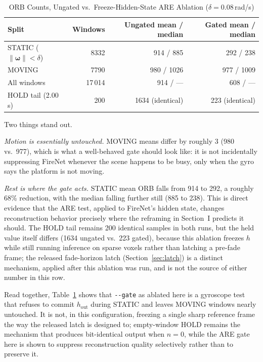 \documentclass[journal]{IEEEtran}
\DeclareRobustCommand{\norm}[1]{\lVert #1 \rVert}
\begin{document}
\begin{table}[!t]
\caption{ORB Counts, Ungated vs.\ Freeze-Hidden-State ARE Ablation
(\(\delta = 0.08\)\,rad/s)}
\label{tab:orb}
\centering
\begin{tabular}{@{}lrrr@{}}
\toprule
Split & Windows & Ungated mean / median & Gated mean / median \\
\midrule
STATIC (\(\norm{\boldsymbol{\omega}}<\delta\)) & 8332 & 914 / 885 & 292 / 238 \\
MOVING & 7790 & 980 / 1026 & 977 / 1009 \\
All windows & 17\,014 & 914 / --- & 608 / --- \\
HOLD tail (2.00\,s) & 200 & 1634 (identical) & 223 (identical) \\
\bottomrule
\end{tabular}
\end{table}

Two things stand out.

\textit{Motion is essentially untouched.} MOVING means differ by roughly 3 (980
vs.\ 977), which is what a well-behaved gate should look like: it is not
incidentally suppressing FireNet whenever the scene happens to be busy, only
when the gyro says the platform is not moving.

\textit{Rest is where the gate acts.} STATIC mean ORB falls from 914 to 292, a
roughly 68\% reduction, with the median falling further still (885 to 238). This
is direct evidence that the ARE test, applied to FireNet's hidden state, changes
reconstruction behavior precisely where the reframing in Section~I predicts it
should. The HOLD tail remains 200 identical samples in both runs, but the held
value itself differs (1634 ungated vs.\ 223 gated), because this ablation
freezes \(h\) while still running inference on sparse voxels rather than
latching a pre-fade frame; the released fade-horizon latch
(Section~\ref{sec:latch}) is a distinct mechanism, applied after this ablation
was run, and is not the source of either number in this row.

Read together, Table~\ref{tab:orb} shows that \texttt{-{}-gate} as ablated here
is a gyroscope test that refuses to commit \(h_{\mathrm{out}}\) during STATIC
and leaves MOVING windows nearly untouched. It is not, in this configuration,
freezing a single sharp reference frame the way the released latch is designed
to; empty-window HOLD remains the mechanism that produces bit-identical output
when \(n=0\), while the ARE gate here is shown to suppress reconstruction
quality selectively rather than to preserve it.
\end{document}
